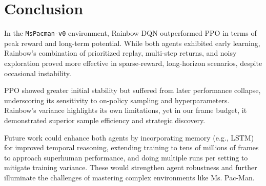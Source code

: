 \documentclass{article}
\begin{document}




\section{Conclusion}

In the \texttt{MsPacman-v0} environment, Rainbow DQN outperformed PPO in terms of peak reward and long-term potential. While both agents exhibited early learning, Rainbow’s combination of prioritized replay, multi-step returns, and noisy exploration proved more effective in sparse-reward, long-horizon scenarios, despite occasional instability.

PPO showed greater initial stability but suffered from later performance collapse, underscoring its sensitivity to on-policy sampling and hyperparameters. Rainbow's variance highlights its own limitations, yet in our frame budget, it demonstrated superior sample efficiency and strategic discovery.

Future work could enhance both agents by incorporating memory (e.g., LSTM) for improved temporal reasoning, extending training to tens of millions of frames to approach superhuman performance, and doing multiple runs per setting to mitigate training variance. These would strengthen agent robustness and further illuminate the challenges of mastering complex environments like Ms. Pac-Man.
\end{document}

